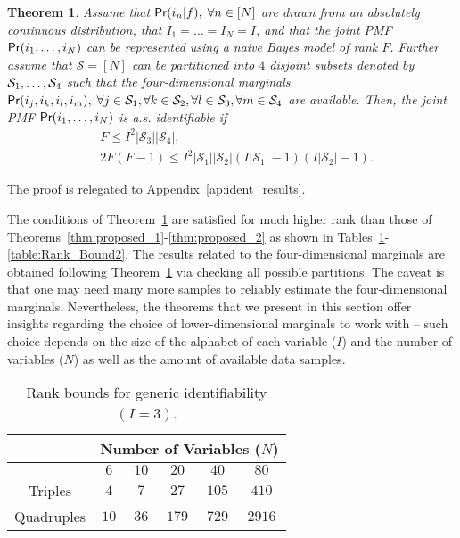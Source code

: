 \documentclass[journal]{IEEEtran}
\newtheorem{Theorem}{Theorem}
\begin{document}
\begin{Theorem}
		Assume that  ${\sf Pr}(i_n| f), \; \forall n\in [N]$ are drawn from an absolutely continuous distribution, that $I_1=\ldots=I_N=I$, and that the joint PMF ${\sf Pr}(i_1,\ldots,i_N)$ can be represented using a naive Bayes model of rank $F$.  Further assume that $\mathcal{S} = [N]$ can be partitioned into $4$ disjoint subsets denoted by ${\cal S}_1,\ldots,{\cal S}_4$ such that the  {four-dimensional marginals} ${\sf Pr}(i_j,i_k,i_l,i_m), \; \forall j \in \mathcal{S}_1, \forall k \in \mathcal{S}_2,\forall l \in \mathcal{S}_3,\forall m \in \mathcal{S}_4$ are available. Then, the joint PMF ${\sf Pr}(i_1,\ldots,i_N)$ is a.s. identifiable if
	\begin{equation*}
	\begin{aligned}
		&F \leq I^2 |\mathcal{S}_3||\mathcal{S}_4|,\\
		&2F(F-1) \leq I^2 |\mathcal{S}_1||\mathcal{S}_2|(I|\mathcal{S}_1| - 1)(I|\mathcal{S}_2|-1).
	\end{aligned}
	\end{equation*}
	\label{thm:proposed_3}
\end{Theorem}
\begin{IEEEproof}
	The proof is relegated to Appendix~\ref{ap:ident_results}.
\end{IEEEproof}


The conditions of Theorem~\ref{thm:proposed_3} are satisfied for much higher rank than those of Theorems~\ref{thm:proposed_1}-\ref{thm:proposed_2} as shown in Tables~\ref{table:Rank_Bound1}-\ref{table:Rank_Bound2}. The results related to the  {four-dimensional} marginals are obtained following Theorem~\ref{thm:proposed_3} via checking all possible partitions. The caveat is that one may need many more samples to reliably estimate the  {four-dimensional} marginals. Nevertheless, the theorems that we present in this section offer insights regarding the choice of  {lower-dimensional} marginals to work with -- such choice depends on the size of the alphabet of each variable ($I$) and the number of variables ($N$) as well as the amount of available data samples.


\begin{table}[!t]
\begin{center}
\caption{Rank bounds for generic identifiability  $(I=3)$.}
\label{table:Rank_Bound1}
\begin{tabular}{c  c  c  c c c}
&  \multicolumn{5}{c}{Number of Variables ($N$)}      \\
\hline
      &  $6$ & $10$	& $20$ & $40$ & $80$   \\
\hline
Triples     &  $4$ & $ 7 $	& $27$ & $105$ & $ 410$   \\
\hline
Quadruples  &  $10$ & $36$	& $179$ & $729$ & $2916$  \\
\hline
\end{tabular}
\end{center}
\end{table}
\end{document}
